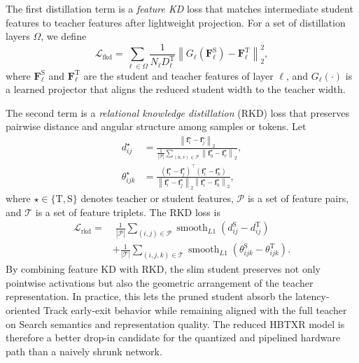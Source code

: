 \documentclass[journal]{IEEEtran}
\begin{document}
The first distillation term is a \emph{feature KD} loss that matches intermediate student features to teacher features after lightweight projection. For a set of distillation layers $\Omega$, we define
\begin{equation}
\mathcal L_{\mathrm{fkd}}=
\sum_{\ell\in\Omega}
\frac{1}{N_{\ell}D_{\ell}^{\mathrm{T}}}
\left\|
G_{\ell}\!\left(\mathbf F_{\ell}^{\mathrm{S}}\right)
-\mathbf F_{\ell}^{\mathrm{T}}
\right\|_2^2,
\end{equation}
where $\mathbf F_{\ell}^{\mathrm{S}}$ and $\mathbf F_{\ell}^{\mathrm{T}}$ are the student and teacher features of layer $\ell$, and $G_{\ell}(\cdot)$ is a learned projector that aligns the reduced student width to the teacher width.

The second term is a \emph{relational knowledge distillation} (RKD) loss that preserves pairwise distance and angular structure among samples or tokens. Let
\begin{align}
d_{ij}^{\star} &=
\frac{\left\|\mathbf f_i^{\star}-\mathbf f_j^{\star}\right\|_2}
{\frac{1}{|\mathcal P|}\sum_{(u,v)\in\mathcal P}\left\|\mathbf f_u^{\star}-\mathbf f_v^{\star}\right\|_2},\\
\theta_{ijk}^{\star} &=
\frac{\left(\mathbf f_i^{\star}-\mathbf f_j^{\star}\right)^{\top}
\left(\mathbf f_i^{\star}-\mathbf f_k^{\star}\right)}
{\left\|\mathbf f_i^{\star}-\mathbf f_j^{\star}\right\|_2
 \left\|\mathbf f_i^{\star}-\mathbf f_k^{\star}\right\|_2},
\end{align}
where $\star\in\{\mathrm{T},\mathrm{S}\}$ denotes teacher or student features, $\mathcal P$ is a set of feature pairs, and $\mathcal T$ is a set of feature triplets. The RKD loss is
\begin{align}
\mathcal L_{\mathrm{rkd}}=
&\;\frac{1}{|\mathcal P|}
\sum_{(i,j)\in\mathcal P}
\operatorname{smooth}_{L1}\!\left(d_{ij}^{\mathrm{S}}-d_{ij}^{\mathrm{T}}\right)
\nonumber\\
&+
\frac{1}{|\mathcal T|}
\sum_{(i,j,k)\in\mathcal T}
\operatorname{smooth}_{L1}\!\left(\theta_{ijk}^{\mathrm{S}}-\theta_{ijk}^{\mathrm{T}}\right).
\end{align}
By combining feature KD with RKD, the slim student preserves not only pointwise activations but also the geometric arrangement of the teacher representation. In practice, this lets the pruned student absorb the latency-oriented Track early-exit behavior while remaining aligned with the full teacher on Search semantics and representation quality. The reduced HBTXR model is therefore a better drop-in candidate for the quantized and pipelined hardware path than a naively shrunk network.
\end{document}
